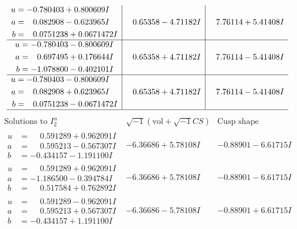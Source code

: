 \documentclass[1p]{elsarticle_modified}
\theoremstyle{definition}
\newcommand{\I}{\sqrt{-1}}
\begin{document}
$$\begin{array}{c|c|c}
\begin{aligned}
u &= -0.780403 + 0.800609 I \\
a &= \phantom{-}0.082908 - 0.623965 I \\
b &= \phantom{-}0.0751238 + 0.0671472 I\end{aligned}
 & \phantom{-}0.65358 - 4.71182 I & \phantom{-}7.76114 + 5.41408 I \\ \hline\begin{aligned}
u &= -0.780403 - 0.800609 I \\
a &= \phantom{-}0.697495 + 0.176644 I \\
b &= -1.078800 - 0.402101 I\end{aligned}
 & \phantom{-}0.65358 + 4.71182 I & \phantom{-}7.76114 - 5.41408 I \\ \hline\begin{aligned}
u &= -0.780403 - 0.800609 I \\
a &= \phantom{-}0.082908 + 0.623965 I \\
b &= \phantom{-}0.0751238 - 0.0671472 I\end{aligned}
 & \phantom{-}0.65358 + 4.71182 I & \phantom{-}7.76114 - 5.41408 I\\
 \hline 
 \end{array}$$\newpage$$\begin{array}{c|c|c}  
\text{Solutions to }I^u_{2}& \I (\text{vol} + \sqrt{-1}CS) & \text{Cusp shape}\\
 \hline 
\begin{aligned}
u &= \phantom{-}0.591289 + 0.962091 I \\
a &= \phantom{-}0.595213 - 0.567307 I \\
b &= -0.434157 - 1.191100 I\end{aligned}
 & -6.36686 + 5.78108 I & -0.88901 - 6.61715 I \\ \hline\begin{aligned}
u &= \phantom{-}0.591289 + 0.962091 I \\
a &= -1.186500 - 0.394784 I \\
b &= \phantom{-}0.517584 + 0.762892 I\end{aligned}
 & -6.36686 + 5.78108 I & -0.88901 - 6.61715 I \\ \hline\begin{aligned}
u &= \phantom{-}0.591289 - 0.962091 I \\
a &= \phantom{-}0.595213 + 0.567307 I \\
b &= -0.434157 + 1.191100 I\end{aligned}
 & -6.36686 - 5.78108 I & -0.88901 + 6.61715 I \\ \hline\begin{aligned}

\end{aligned}
\end{array}$$
\end{document}

